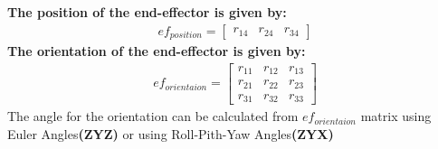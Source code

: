 \documentclass[12pt,a4paper]{article}
\begin{document}
\textbf{The position of the end-effector is given by:}
\begin{align*}
ef_{position} = \begin{bmatrix}
	r_{14} & r_{24} & r_{34}
	\end{bmatrix}
\end{align*}
\textbf{The orientation of the end-effector is given by:}
\begin{align*}
ef_{orientaion} = \begin{bmatrix}
r_{11} & r_{12} & r_{13} \\
	r_{21} & r_{22} & r_{23} \\
	r_{31} & r_{32} & r_{33}
\end{bmatrix}
\end{align*}
The angle for the orientation can be calculated from $ef_{orientaion}$ matrix using Euler Angles\textbf{(ZYZ)} or using Roll-Pith-Yaw Angles\textbf{(ZYX)}
\end{document}

